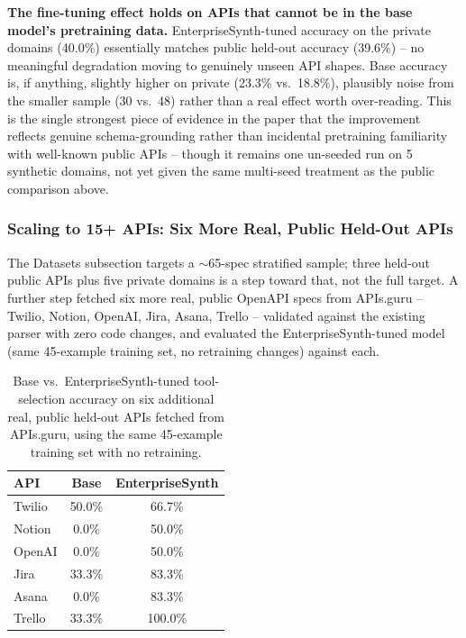\documentclass[11pt]{article}
\begin{document}
\textbf{The fine-tuning effect holds on APIs that cannot be in the base model's pretraining
data.} EnterpriseSynth-tuned accuracy on the private domains (40.0\%) essentially matches public
held-out accuracy (39.6\%) -- no meaningful degradation moving to genuinely unseen API shapes.
Base accuracy is, if anything, slightly higher on private (23.3\% vs.\ 18.8\%), plausibly noise
from the smaller sample (30 vs.\ 48) rather than a real effect worth over-reading. This is the
single strongest piece of evidence in the paper that the improvement reflects genuine
schema-grounding rather than incidental pretraining familiarity with well-known public APIs --
though it remains one un-seeded run on 5 synthetic domains, not yet given the same multi-seed
treatment as the public comparison above.

\subsubsection{Scaling to 15+ APIs: Six More Real, Public Held-Out APIs}
The Datasets subsection targets a $\sim$65-spec stratified sample; three held-out public APIs
plus five private domains is a step toward that, not the full target. A further step fetched six
more real, public OpenAPI specs from APIs.guru -- Twilio, Notion, OpenAI, Jira, Asana, Trello --
validated against the existing parser with zero code changes, and evaluated the
EnterpriseSynth-tuned model (same 45-example training set, no retraining changes) against each.

\begin{table}[htbp]
\centering
\footnotesize
\setlength{\tabcolsep}{2pt}
\caption{Base vs.\ EnterpriseSynth-tuned tool-selection accuracy on six additional real, public
held-out APIs fetched from APIs.guru, using the same 45-example training set with no retraining.}
\label{tab:six-more-apis}
\begin{tabular}{lcc}
\toprule
\textbf{API} & \textbf{Base} & \textbf{EnterpriseSynth} \\
\midrule
Twilio & 50.0\% & 66.7\% \\
Notion & 0.0\% & 50.0\% \\
OpenAI & 0.0\% & 50.0\% \\
Jira & 33.3\% & 83.3\% \\
Asana & 0.0\% & 83.3\% \\
Trello & 33.3\% & 100.0\% \\
\bottomrule
\end{tabular}
\end{table}
\end{document}
